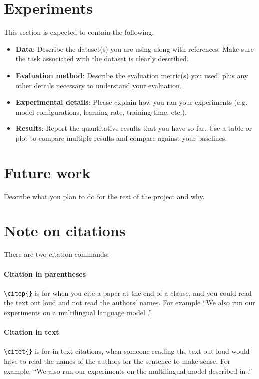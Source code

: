 \documentclass{article}
\begin{document}
\section{Experiments}
This section is expected to contain the following.
\begin{itemize}
    \item \textbf{Data}: Describe the dataset(s) you are using along with references. Make sure the task associated with the dataset is clearly described.
    \item \textbf{Evaluation method}: Describe the evaluation metric(s) you used, plus any other details necessary to understand your evaluation.
    \item \textbf{Experimental details}: Please explain how you ran your experiments (e.g. model configurations, learning rate, training time, etc.).
    \item \textbf{Results}: Report the quantitative results that you have so far. Use a table or plot to compare multiple results and compare against your baselines.
\end{itemize}


\section{Future work}
Describe what you plan to do for the rest of the project and why.

\section{Note on citations}

There are two citation commands:

\paragraph{Citation in parentheses} \verb|\citep{}| is for when you cite a paper at the end of a clause, and you could read the text out loud and not read the authors' names. For example ``We also run our experiments on a multilingual language model \citep{conneau2020unsupervised}.'' 

\paragraph{Citation in text} \verb|\citet{}| is for in-text citations, when someone reading the text out loud would have to read the names of the authors for the sentence to make sense. For example, ``We also run our experiments on the multilingual model described in \citet{conneau2020unsupervised}.''



\end{document}
